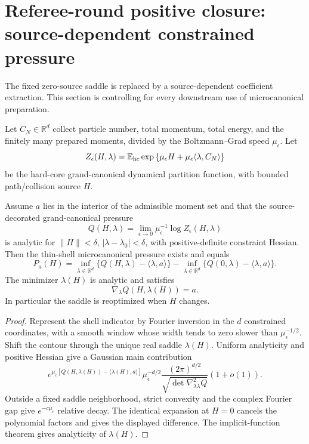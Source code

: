 \section{Referee-round positive closure: source-dependent constrained pressure}
\label{sec:rr2-b1}

The fixed zero-source saddle is replaced by a source-dependent coefficient
extraction.  This section is controlling for every downstream use of
microcanonical preparation.

Let \(C_N\in\mathbb R^d\) collect particle number, total momentum, total
energy, and the finitely many prepared moments, divided by the
Boltzmann--Grad speed \(\mu_\epsilon\).  Let
\[
 Z_\epsilon(H,\lambda)
 =
 \mathbb E_{\rm hc}
 \exp\left\{
 \mu_\epsilon H+\mu_\epsilon\langle\lambda,C_N\rangle
 \right\}
\]
be the hard-core grand-canonical dynamical partition function, with bounded
path/collision source \(H\).

\begin{theorem}
\label{thm:rr2-b1-constrained}
Assume \(a\) lies in the interior of the admissible moment set and that the
source-decorated grand-canonical pressure
\[
 Q(H,\lambda)=
 \lim_{\epsilon\to0}\mu_\epsilon^{-1}\log Z_\epsilon(H,\lambda)
\]
is analytic for \(\|H\|<\delta\), \(|\lambda-\lambda_0|<\delta\), with
positive-definite constraint Hessian.  Then the thin-shell microcanonical
pressure exists and equals
\[
 P_a(H)
 =
 \inf_{\lambda\in\mathbb R^d}
 \{Q(H,\lambda)-\langle\lambda,a\rangle\}
 -
 \inf_{\lambda\in\mathbb R^d}
 \{Q(0,\lambda)-\langle\lambda,a\rangle\}.
\]
The minimizer \(\lambda(H)\) is analytic and satisfies
\[
 \nabla_\lambda Q(H,\lambda(H))=a .
\]
In particular the saddle is reoptimized when \(H\) changes.
\end{theorem}

\begin{proof}
Represent the shell indicator by Fourier inversion in the \(d\) constrained
coordinates, with a smooth window whose width tends to zero slower than
\(\mu_\epsilon^{-1/2}\).  Shift the contour through the unique real saddle
\(\lambda(H)\).  Uniform analyticity and positive Hessian give a Gaussian
main contribution
\[
 e^{\mu_\epsilon[Q(H,\lambda(H))-\langle\lambda(H),a\rangle]}
 \mu_\epsilon^{-d/2}
 \frac{(2\pi)^{d/2}}{\sqrt{\det\nabla^2_{\lambda\lambda}Q}}
 (1+o(1)).
\]
Outside a fixed saddle neighborhood, strict convexity and the complex
Fourier gap give \(e^{-c\mu_\epsilon}\) relative decay.  The identical
expansion at \(H=0\) cancels the polynomial factors and gives the displayed
difference.  The implicit-function theorem gives analyticity of
\(\lambda(H)\).
\end{proof}

